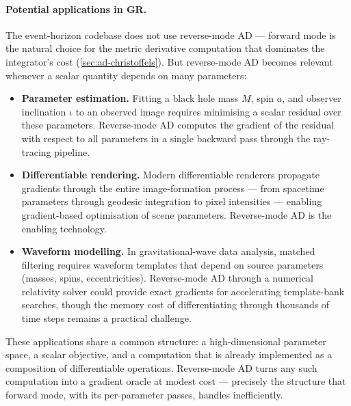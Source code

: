 \paragraph{Potential applications in GR.}

The event-horizon codebase does not use reverse-mode AD ---
forward mode is the natural choice for the metric derivative
computation that dominates the integrator's cost
(\cref{sec:ad-christoffels}).  But reverse-mode AD becomes
relevant whenever a scalar quantity depends on many
parameters:

\begin{itemize}
\item \textbf{Parameter estimation.}  Fitting a black hole
  mass $M$, spin $a$, and observer inclination $\iota$ to
  an observed image requires minimising a scalar residual
  over these parameters.  Reverse-mode AD computes the
  gradient of the residual with respect to all parameters
  in a single backward pass through the ray-tracing
  pipeline.

\item \textbf{Differentiable rendering.}  Modern
  differentiable renderers propagate gradients through the
  entire image-formation process --- from spacetime
  parameters through geodesic integration to pixel
  intensities --- enabling gradient-based optimisation of
  scene parameters.  Reverse-mode AD is the enabling
  technology.

\item \textbf{Waveform modelling.}  In gravitational-wave
  data analysis, matched filtering requires waveform
  templates that depend on source parameters (masses, spins,
  eccentricities).  Reverse-mode AD through a numerical
  relativity solver could provide exact gradients for
  accelerating template-bank searches, though the memory
  cost of differentiating through thousands of time steps
  remains a practical challenge.
\end{itemize}

\noindent
These applications share a common structure: a
high-dimensional parameter space, a scalar objective, and a
computation that is already implemented as a composition of
differentiable operations.  Reverse-mode AD turns any such
computation into a gradient oracle at modest cost ---
precisely the structure that forward mode, with its
per-parameter passes, handles inefficiently.

